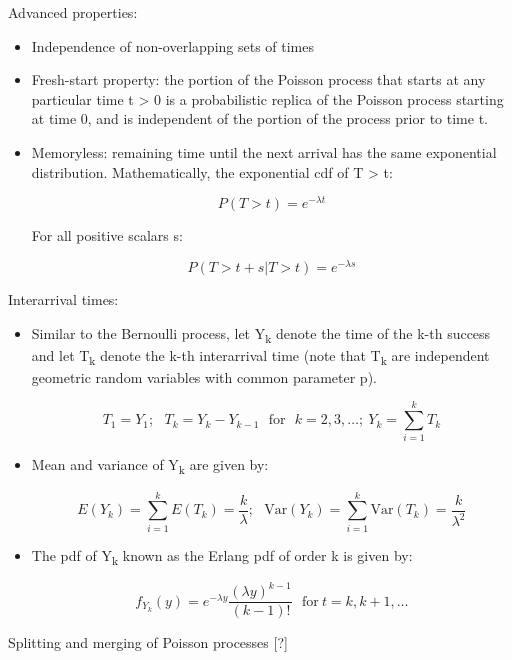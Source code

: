 \documentclass[12pt]{report}
\renewcommand{\_}{\kern-1.5pt\textunderscore\kern-1.5pt}
\begin{document}
	\item Advanced properties:\par

\begin{itemize}
	\item Independence of non-overlapping sets of times\par

	\item Fresh-start property: the portion of the Poisson process that starts at any particular time t > 0 is a probabilistic replica of the Poisson process starting at time 0, and is independent of the portion of the process prior to time t. \par

	\item Memoryless: remaining time until the next arrival has the same exponential distribution. Mathematically, the exponential cdf of T > t:\par

 \[ P \left( T>t \right) =e^{- \lambda t} \] \par

For all positive scalars s:\par

 \[ P \left( T>t+s \vert T>t \right) =e^{- \lambda s} \] \par


\end{itemize}
	\item Interarrival times:\par

\begin{itemize}
	\item Similar to the Bernoulli process, let Y\textsubscript{k} denote the time of the k-th success and let T\textsubscript{k} denote the k-th interarrival time (note that T\textsubscript{k} are independent geometric random variables with common parameter p).\par

 \[ T_{1}=Y_{1};~~~T_{k}=Y_{k}-Y_{k-1}~~~\mathrm{for~~~}k=2, 3, \ldots ;~Y_{k}= \sum _{i=1}^{k}T_{k} \] \par

	\item Mean and variance of Y\textsubscript{k} are given by:\par

 \[ E \left( Y_{k} \right) = \sum _{i=1}^{k}E \left( T_{k} \right) =\frac{k}{ \lambda };~~~\mathrm{Var} \left( Y_{k} \right) = \sum _{i=1}^{k}\mathrm{Var} \left( T_{k} \right) =\frac{k}{ \lambda ^{2}} \] \par

	\item The pdf of Y\textsubscript{k} known as the Erlang pdf of order k is given by:\par

 \[ f_{Y_{k}} \left( y \right) =e^{- \lambda y}\frac{ \left(  \lambda y \right) ^{k-1}}{ \left( k-1 \right) !}~~~\mathrm{for~}t=k, k+1, \ldots  \] \par


\end{itemize}
	\item Splitting and merging of Poisson processes [?]\par
\end{document}
